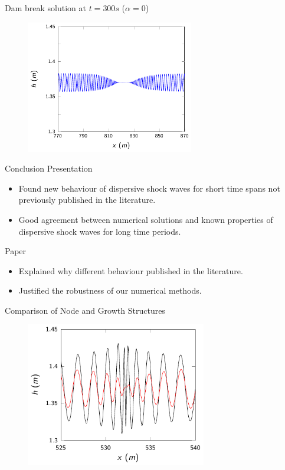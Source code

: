 \documentclass[pdf]{beamer}
\begin{document}
\begin{frame}{Dam break solution at $t=300s$ ($\alpha = 0$)}
	\begin{figure}
		\includegraphics[width=0.65\textwidth]{./Pictures/Results/Example/F300.pdf}
	\end{figure}
	
\end{frame}



\begin{frame}{Conclusion}
	Presentation
	\begin{itemize}
		\item Found new behaviour of dispersive shock waves for short time spans not previously published in the literature.
		\item Good agreement between numerical solutions and known properties of dispersive shock waves for long time periods.
	\end{itemize}
	Paper
		\begin{itemize}
			\item Explained why different behaviour published in the literature.
			\item Justified the robustness of our numerical methods.
		\end{itemize}
\end{frame}

\begin{frame}{Comparison of Node and Growth Structures}
	\begin{figure}
		\includegraphics[width=0.7\textwidth]{./Pictures/Results/Example/912Comparison.pdf}
	\end{figure}
\end{frame}
\end{document}
